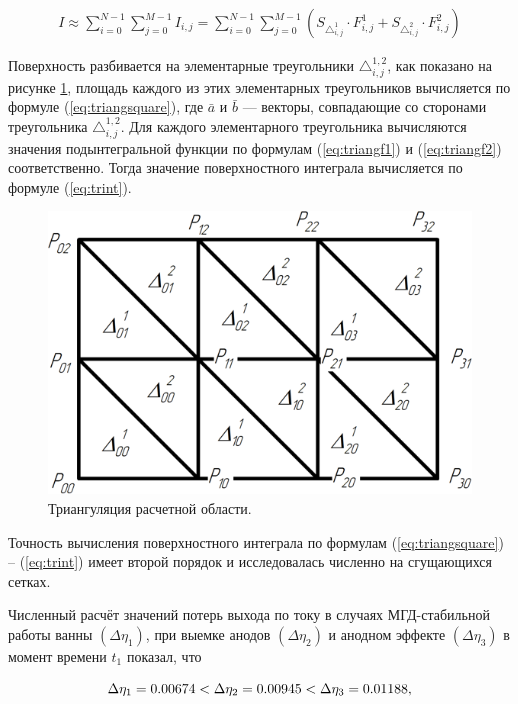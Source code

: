 \documentclass[]{pmi}
\begin{document}
\begin{align}\label{eq:trint}
I \approx \sum_{i=0}^{N-1} \sum_{j=0}^{M-1} I_{i,j} = \sum_{i=0}^{N-1} \sum_{j=0}^{M-1} (S_{\triangle_{i,j}^1} \cdot F_{i,j}^1 + S_{\triangle_{i,j}^2} \cdot F_{i,j}^2)
\end{align}

Поверхность разбивается на элементарные треугольники $\triangle_{i,j}^{1,2}$, как показано на рисунке \ref{fig:triangles}, площадь каждого из этих элементарных треугольников вычисляется по формуле (\ref{eq:triangsquare}), где $\bar{a}$ и $\bar{b}$ — векторы, совпадающие со сторонами треугольника $\triangle_{i,j}^{1,2}$. Для каждого элементарного треугольника вычисляются значения подынтегральной функции по формулам (\ref{eq:triangf1}) и (\ref{eq:triangf2}) соответственно. Тогда значение поверхностного интеграла вычисляется по формуле (\ref{eq:trint}).

\begin{figure}[H]
    \centering
    \includegraphics[width=150mm]{triangul.png}
    \caption{Триангуляция расчетной области.}
    \label{fig:triangles} 
\end{figure}

Точность вычисления поверхностного интеграла по формулам (\ref{eq:triangsquare}) – (\ref{eq:trint}) имеет второй порядок и исследовалась численно на сгущающихся сетках.

Численный расчёт значений потерь выхода по току в случаях МГД-стабильной работы ванны $(\Delta\eta_1)$, при выемке анодов $(\Delta\eta_2)$ и анодном эффекте $(\Delta\eta_3)$ в момент времени $t_1$ показал, что 

\begin{equation}
\Delta\eta_1 = 0.00674 < \Delta\eta_2 = 0.00945 < \Delta\eta_3 = 0.01188, \notag
\end{equation}
\end{document}
